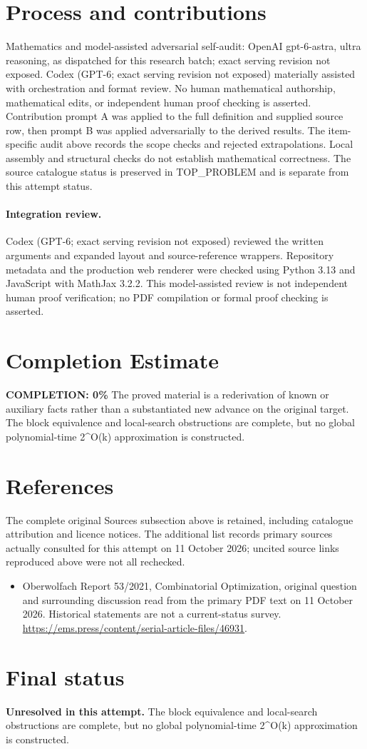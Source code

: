 \documentclass[11pt]{article}
\begin{document}
\section{Process and contributions}
Mathematics and model-assisted adversarial self-audit: OpenAI gpt-6-astra, ultra reasoning, as dispatched for this research batch; exact serving revision not exposed. Codex (GPT-6; exact serving revision not exposed) materially assisted with orchestration and format review. No human mathematical authorship, mathematical edits, or independent human proof checking is asserted.
Contribution prompt A was applied to the full definition and supplied source row, then prompt B was applied adversarially to the derived results. The item-specific audit above records the scope checks and rejected extrapolations. Local assembly and structural checks do not establish mathematical correctness. The source catalogue status is preserved in TOP\_PROBLEM and is separate from this attempt status.
\paragraph{Integration review.} Codex (GPT-6; exact serving revision not exposed) reviewed the written arguments and expanded layout and source-reference wrappers. Repository metadata and the production web renderer were checked using Python 3.13 and JavaScript with MathJax 3.2.2. This model-assisted review is not independent human proof verification; no PDF compilation or formal proof checking is asserted.

\section{Completion Estimate}
\noindent\textbf{COMPLETION: 0\%}
The proved material is a rederivation of known or auxiliary facts rather than a substantiated new advance on the original target. The block equivalence and local-search obstructions are complete, but no global polynomial-time 2^{O(k)} approximation is constructed.
\section{References}
The complete original Sources subsection above is retained, including catalogue attribution and licence notices. The additional list records primary sources actually consulted for this attempt on 11 October 2026; uncited source links reproduced above were not all rechecked.
\begin{itemize}
\item Oberwolfach Report 53/2021, Combinatorial Optimization, original question and surrounding discussion read from the primary PDF text on 11 October 2026. Historical statements are not a current-status survey. \url{https://ems.press/content/serial-article-files/46931}.
\end{itemize}
\section{Final status}
\textbf{Unresolved in this attempt.} The block equivalence and local-search obstructions are complete, but no global polynomial-time 2^{O(k)} approximation is constructed.
\end{document}
